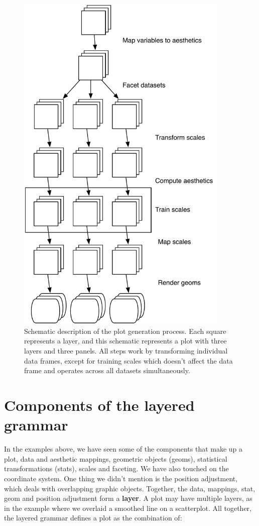 \begin{figure}[htbp]
  \centering
  \includegraphics[width=4in]{mastery-schema}
  \caption{Schematic description of the plot generation process. Each square represents a layer, and this schematic represents a plot with three layers and three panels. All steps work by transforming individual data frames, except for training scales which doesn't affect the data frame and operates across all datasets simultaneously.}
  \label{fig:schematic}
\end{figure}

\section{Components of the layered grammar}
\label{sec:components}

In the examples above, we have seen some of the components that make up a plot, data and aesthetic mappings, geometric objects (geoms), statistical transformations (stats), scales and faceting. We have also touched on the coordinate system. One thing we didn't mention is the position adjustment, which deals with overlapping graphic objects. Together, the data, mappings, stat, geom and position adjustment form a {\bf layer}. A plot may have multiple layers, as in the example where we overlaid a smoothed line on a scatterplot. All together, the layered grammar defines a plot as the combination of: 

